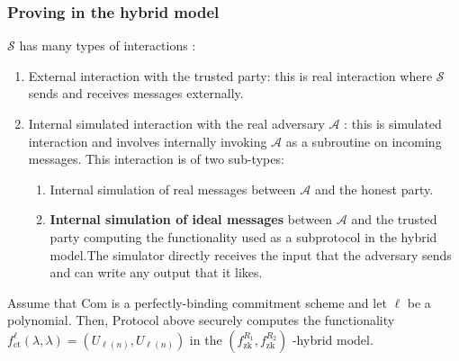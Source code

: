 \documentclass{beamer}
\begin{document}
    \begin{frame}
        \frametitle{Proving in the hybrid model}
        $\mathcal{S}$ has many types of interactions :
        \begin{enumerate}
            \item External interaction with the trusted party: this is real interaction where $\mathcal{S}$ sends and receives messages externally.
            \item Internal simulated interaction with the real adversary $\mathcal{A}$ : this is simulated interaction and involves internally invoking $\mathcal{A}$ as a subroutine on incoming messages. This interaction is of two sub-types:
            \begin{enumerate}[a]
                \item  Internal simulation of real messages between $\mathcal{A}$ and the honest party.
                \item  \textbf{Internal simulation of ideal messages} between $\mathcal{A}$ and the trusted party computing the functionality used as a subprotocol in the hybrid model.The simulator directly receives the input that the adversary sends and can write any output that it likes.
            \end{enumerate}
        \end{enumerate}

        \begin{theorem}
            Assume that $\mathrm{Com}$ is a perfectly-binding commitment scheme and let $\ell$ be a polynomial. Then, Protocol above securely computes the functionality $f_{\mathrm{ct}}^{\ell}(\lambda, \lambda)=\left(U_{\ell(n)}, U_{\ell(n)}\right)$ in the $\left(f_{\mathrm{zk}}^{R_{1}}, f_{\mathrm{zk}}^{R_{2}}\right)$ -hybrid model.
        \end{theorem}
        
    
    \end{frame}
\end{document}
